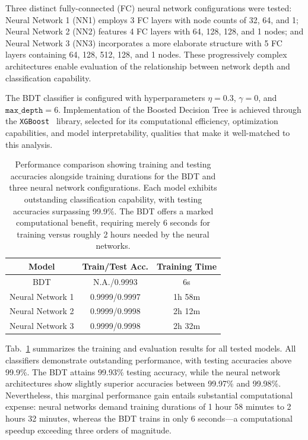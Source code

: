 Three distinct fully-connected (FC) neural network configurations were tested: Neural Network 1 (NN1) employs 3 FC layers with node counts of 32, 64, and 1; Neural Network 2 (NN2) features 4 FC layers with 64, 128, 128, and 1 nodes; and Neural Network 3 (NN3) incorporates a more elaborate structure with 5 FC layers containing 64, 128, 512, 128, and 1 nodes. These progressively complex architectures enable evaluation of the relationship between network depth and classification capability.

The BDT classifier is configured with hyperparameters $\eta=0.3$, $\gamma = 0$, and $\texttt{max\_depth} = 6$. Implementation of the Boosted Decision Tree is achieved through the \texttt{XGBoost}~\parencite{chen_xgboost_2016} library, selected for its computational efficiency, optimization capabilities, and model interpretability, qualities that make it well-matched to this analysis. 



\begin{table}
    \centering
    \begin{tabular}{c  c  c}
    \hline
    { Model} & { Train/Test Acc. } & { Training Time} \\
    \hline
    \small
    BDT & N.A./0.9993  & 6s\\
    Neural Network 1 & 0.9999/0.9997 & 1h 58m \\
    Neural Network 2 & 0.9999/0.9998 & 2h 12m \\
    Neural Network 3 & 0.9999/0.9998 & 2h 32m\\
    \hline
    \end{tabular}
    \caption{Performance comparison showing training and testing accuracies alongside training durations for the BDT and three neural network configurations. Each model exhibits outstanding classification capability, with testing accuracies surpassing 99.9\%. The BDT offers a marked computational benefit, requiring merely 6 seconds for training versus roughly 2 hours needed by the neural networks.}\label{tab:ml_results}
    \centering
\end{table}

Tab.~\ref{tab:ml_results} summarizes the training and evaluation results for all tested models. All classifiers demonstrate outstanding performance, with testing accuracies above 99.9\%. The BDT attains 99.93\% testing accuracy, while the neural network architectures show slightly superior accuracies between 99.97\% and 99.98\%. Nevertheless, this marginal performance gain entails substantial computational expense: neural networks demand training durations of 1 hour 58 minutes to 2 hours 32 minutes, whereas the BDT trains in only 6 seconds—a computational speedup exceeding three orders of magnitude.

